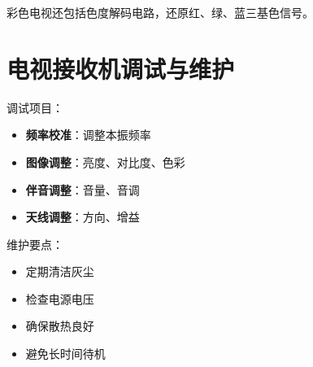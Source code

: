 彩色电视还包括色度解码电路，还原红、绿、蓝三基色信号。

\section{电视接收机调试与维护}
\label{sec:tv_receiver_maintenance}

调试项目：
\begin{itemize}
    \item \textbf{频率校准}：调整本振频率
    \item \textbf{图像调整}：亮度、对比度、色彩
    \item \textbf{伴音调整}：音量、音调
    \item \textbf{天线调整}：方向、增益
\end{itemize}

维护要点：
\begin{itemize}
    \item 定期清洁灰尘
    \item 检查电源电压
    \item 确保散热良好
    \item 避免长时间待机
\end{itemize}